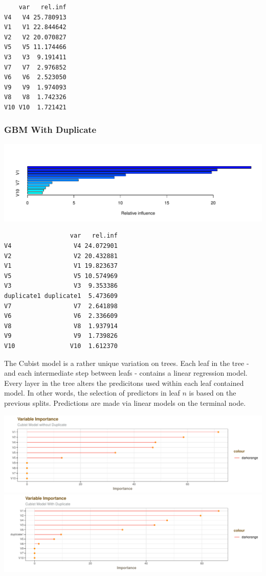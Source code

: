 \documentclass[]{report}
\begin{document}
\begin{verbatim}
    var   rel.inf
V4   V4 25.780913
V1   V1 22.844642
V2   V2 20.070827
V5   V5 11.174466
V3   V3  9.191411
V7   V7  2.976852
V6   V6  2.523050
V9   V9  1.974093
V8   V8  1.742326
V10 V10  1.721421
\end{verbatim}

\subsubsection{GBM With Duplicate}\label{gbm-with-duplicate}

\includegraphics{Homework-Two2_files/figure-latex/kj-8.1da-1.pdf}

\begin{verbatim}
                  var   rel.inf
V4                 V4 24.072901
V2                 V2 20.432881
V1                 V1 19.823637
V5                 V5 10.574969
V3                 V3  9.353386
duplicate1 duplicate1  5.473609
V7                 V7  2.641898
V6                 V6  2.336609
V8                 V8  1.937914
V9                 V9  1.739826
V10               V10  1.612370
\end{verbatim}

The Cubist model is a rather unique variation on trees. Each leaf in the
tree - and each intermediate step between leafs - contains a linear
regression model. Every layer in the tree alters the predicitons used
within each leaf contained model. In other words, the selection of
predictors in leaf \(n\) is based on the previous splits. Predictions
are made via linear models on the terminal node.

\includegraphics{Homework-Two2_files/figure-latex/kj-8.1db-1.pdf}
\includegraphics{Homework-Two2_files/figure-latex/kj-8.1db-2.pdf}
\end{document}

